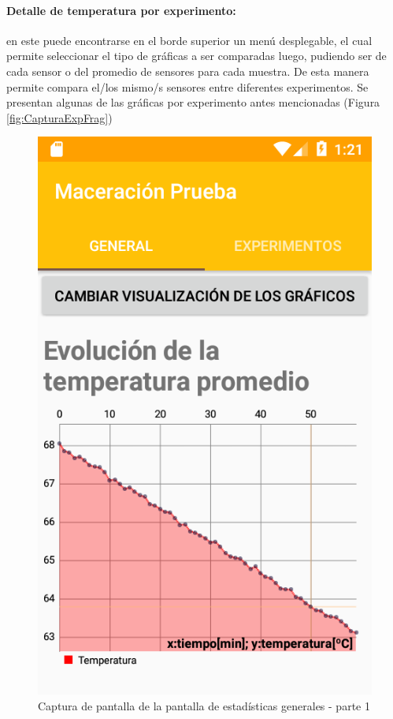             \paragraph{Detalle de temperatura por experimento:} en este puede encontrarse en el borde superior un menú desplegable, el cual permite seleccionar el tipo de gráficas a ser comparadas luego, pudiendo ser de cada sensor o del promedio de sensores para cada muestra. De esta manera permite compara el/los mismo/s sensores entre diferentes experimentos. Se presentan algunas de las gráficas por experimento antes mencionadas (Figura \ref{fig:CapturaExpFrag})
            
            \begin{figure}[h]
                \centering
                \includegraphics[scale=0.2]{software/ScreenCapture/GeneralStatistics.jpg}
                \caption{Captura de pantalla de la pantalla de estadísticas generales - parte 1}
                \label{fig:CapturaGeneralFrag-P1}
            \end{figure}
            
